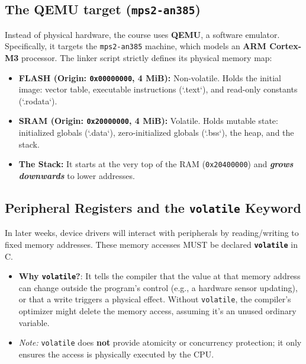 \subsection{The QEMU target (\texttt{mps2-an385})}
Instead of physical hardware, the course uses \textbf{QEMU}, a software emulator. Specifically, it targets the \texttt{mps2-an385} machine, which models an \textbf{ARM Cortex-M3} processor. The linker script strictly defines its physical memory map:
\begin{itemize}
    \item \textbf{FLASH (Origin: \texttt{0x00000000}, 4 MiB):} Non-volatile. Holds the initial image: vector table, executable instructions (`.text`), and read-only constants (`.rodata`).
    \item \textbf{SRAM (Origin: \texttt{0x20000000}, 4 MiB):} Volatile. Holds mutable state: initialized globals (`.data`), zero-initialized globals (`.bss`), the heap, and the stack. 
    \item \textbf{The Stack:} It starts at the very top of the RAM (\texttt{0x20400000}) and \textbf{\textit{grows downwards}} to lower addresses.
\end{itemize}

\subsection{Peripheral Registers and the \texttt{volatile} Keyword}
In later weeks, device drivers will interact with peripherals by reading/writing to fixed memory addresses. These memory accesses MUST be declared \textbf{\texttt{volatile}} in C. 
\begin{itemize}
    \item \textbf{Why \texttt{volatile}?}: It tells the compiler that the value at that memory address can change outside the program's control (e.g., a hardware sensor updating), or that a write triggers a physical effect. Without \texttt{volatile}, the compiler's optimizer might delete the memory access, assuming it's an unused ordinary variable. 
    \item \textit{Note:} \texttt{volatile} does \textbf{not} provide atomicity or concurrency protection; it only ensures the access is physically executed by the CPU.
\end{itemize}

